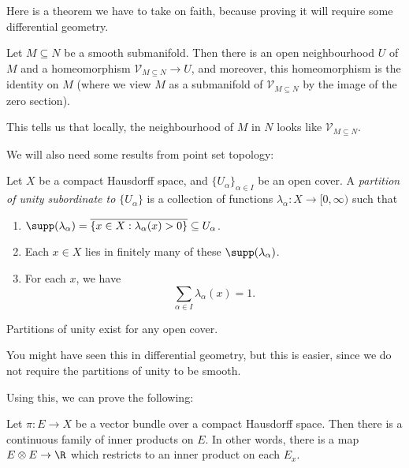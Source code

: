 \documentclass[a4paper]{article}
\begin{document}
Here is a theorem we have to take on faith, because proving it will require some differential geometry.
\begin{thm}
  Let $M \subseteq N$ be a smooth submanifold. Then there is an open neighbourhood $U$ of $M$ and a homeomorphism $\mathcal{V}_{M \subseteq N} \to U$, and moreover, this homeomorphism is the identity on $M$ (where we view $M$ as a submanifold of $\mathcal{V}_{M \subseteq N}$ by the image of the zero section).
\end{thm}
This tells us that locally, the neighbourhood of $M$ in $N$ looks like $\mathcal{V}_{M \subseteq N}$.

We will also need some results from point set topology:
\begin{defi}
  Let $X$ be a compact Hausdorff space, and $\{U_\alpha\}_{\alpha \in I}$ be an open cover. A \emph{partition of unity subordinate to $\{U_\alpha\}$} is a collection of functions $\lambda_\alpha: X \to [0, \infty)$ such that
  \begin{enumerate}
    \item $\supp(\lambda_\alpha) = \overline{\{x \in X: \lambda_\alpha(x) > 0\}} \subseteq U_\alpha$.
    \item Each $x \in X$ lies in finitely many of these $\supp (\lambda_\alpha)$.
    \item For each $x$, we have
      \[
        \sum_{\alpha \in I}\lambda_\alpha(x) = 1.
      \]
  \end{enumerate}
\end{defi}

\begin{prop}
  Partitions of unity exist for any open cover.
\end{prop}

You might have seen this in differential geometry, but this is easier, since we do not require the partitions of unity to be smooth.

Using this, we can prove the following:
\begin{lemma}
  Let $\pi: E \to X$ be a vector bundle over a compact Hausdorff space. Then there is a continuous family of inner products on $E$. In other words, there is a map $E \otimes E \to \R$ which restricts to an inner product on each $E_x$.
\end{lemma}
\end{document}
